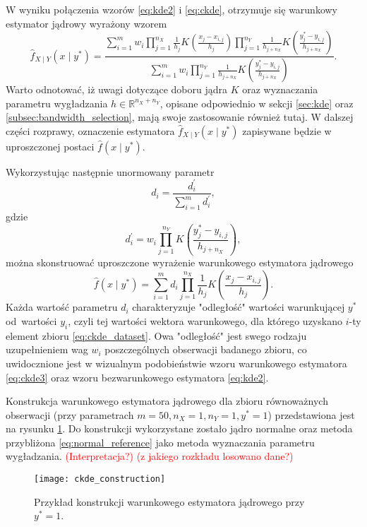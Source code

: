 W wyniku połączenia wzorów \eqref{eq:kde2} i \eqref{eq:ckde}, otrzymuje się warunkowy estymator jądrowy wyrażony wzorem
\begin{equation} \label{eq:ckde2}
\hat{f}_{X \mid Y}(x \mid y^*) = \frac{\sum_{i=1}^m w_i \prod_{j=1}^{n_X} \frac{1}{h_j} K \left( \frac{x_j-x_{i,j}}{h_j} \right) \prod_{j=1}^{n_Y} \frac{1}{h_{j+n_X}} K \left( \frac{y^*_j-y_{i,j}}{h_{j+n_X}} \right)}
{\sum_{i=1}^m w_i \prod_{j=1}^{n_Y} \frac{1}{h_{j+n_X}} K \left( \frac{y^*_j-y_{i,j}}{h_{j+n_X}} \right)}.
\end{equation}
Warto odnotować, iż uwagi dotyczące doboru jądra $K$ oraz wyznaczania parametru wygładzania $h \in \mathbb{R}^{n_X+n_Y}$, opisane odpowiednio w sekcji \ref{sec:kde} oraz \ref{subsec:bandwidth_selection}, mają swoje zastosowanie również tutaj.
W dalszej części rozprawy, oznaczenie estymatora $\hat{f}_{X \mid Y}(x \mid y^*)$ zapisywane będzie w uproszczonej postaci $\hat{f}(x \mid y^*)$.

Wykorzystując następnie unormowany parametr
\begin{equation} \label{eq:d}
d_i = \frac{d_i^\prime}{\sum_{i=1}^m d_i^\prime},
\end{equation}
gdzie
\begin{equation} \label{eq:d_prim}
d_i^\prime = w_i \prod_{j=1}^{n_Y} K \left( \frac{y^*_j-y_{i,j}}{h_{j+n_X}} \right),
\end{equation}
można skonstruować uproszczone wyrażenie warunkowego estymatora jądrowego
\begin{equation} \label{eq:ckde3}
\hat{f}(x \mid y^*) = \sum_{i=1}^m d_i \prod_{j=1}^{n_X} \frac{1}{h_j} K \left( \frac{x_j-x_{i,j}}{h_j} \right).
\end{equation}
Każda wartość parametru $d_i$ charakteryzuje "odległość" wartości warunkującej $y^*$ od~wartości $y_i$, czyli tej wartości wektora warunkowego, dla którego uzyskano $i$-ty element zbioru \eqref{eq:ckde_dataset}. Owa "odległość" jest swego rodzaju uzupełnieniem wag $w_i$ poszczególnych obserwacji badanego zbioru, co uwidocznione jest w wizualnym podobieństwie wzoru warunkowego estymatora \eqref{eq:ckde3} oraz wzoru bezwarunkowego estymatora \eqref{eq:kde2}.

\begin{exmp}
Konstrukcja warunkowego estymatora jądrowego dla zbioru równoważnych obserwacji (przy parametrach $m=50, n_X=1, n_Y=1, y^*=1$) przedstawiona jest na rysunku \ref{fig:ckde_construction}. Do konstrukcji wykorzystane zostało jądro normalne oraz metoda przybliżona \eqref{eq:normal_reference} jako metoda wyznaczania parametru wygładzania. \textcolor{red}{(Interpretacja?) (z jakiego rozkładu losowano dane?)}

\begin{figure}[H]
    \centering
    \texttt{[image: ckde\_construction]}
    \vspace{-0.5cm} 
    \caption{Przykład konstrukcji warunkowego estymatora jądrowego przy $y^*=1$.}
    \label{fig:ckde_construction}
\end{figure}
\end{exmp}